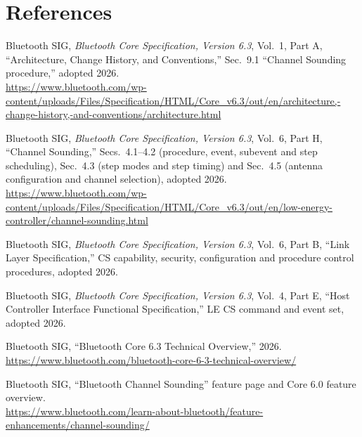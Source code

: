 \documentclass[11pt,a4paper]{article}
\begin{document}
\FloatBarrier
\section*{References}

\begin{enumerate}[label={[\arabic*]},leftmargin=2.2em,itemsep=3pt]
\item Bluetooth SIG, \emph{Bluetooth Core Specification, Version 6.3}, Vol.\ 1, Part A,
  ``Architecture, Change History, and Conventions,'' Sec.\ 9.1 ``Channel Sounding procedure,''
  adopted 2026.\\
  {\small\url{https://www.bluetooth.com/wp-content/uploads/Files/Specification/HTML/Core_v6.3/out/en/architecture,-change-history,-and-conventions/architecture.html}}

\item Bluetooth SIG, \emph{Bluetooth Core Specification, Version 6.3}, Vol.\ 6, Part H,
  ``Channel Sounding,'' Secs.\ 4.1--4.2 (procedure, event, subevent and step scheduling),
  Sec.\ 4.3 (step modes and step timing) and Sec.\ 4.5 (antenna configuration and channel
  selection), adopted 2026.\\
  {\small\url{https://www.bluetooth.com/wp-content/uploads/Files/Specification/HTML/Core_v6.3/out/en/low-energy-controller/channel-sounding.html}}

\item Bluetooth SIG, \emph{Bluetooth Core Specification, Version 6.3}, Vol.\ 6, Part B,
  ``Link Layer Specification,'' CS capability, security, configuration and procedure control
  procedures, adopted 2026.

\item Bluetooth SIG, \emph{Bluetooth Core Specification, Version 6.3}, Vol.\ 4, Part E,
  ``Host Controller Interface Functional Specification,'' LE CS command and event set, adopted 2026.

\item Bluetooth SIG, ``Bluetooth Core 6.3 Technical Overview,'' 2026.\\
  {\small\url{https://www.bluetooth.com/bluetooth-core-6-3-technical-overview/}}

\item Bluetooth SIG, ``Bluetooth Channel Sounding'' feature page and Core 6.0 feature overview.\\
  {\small\url{https://www.bluetooth.com/learn-about-bluetooth/feature-enhancements/channel-sounding/}}


\end{enumerate}
\end{document}
